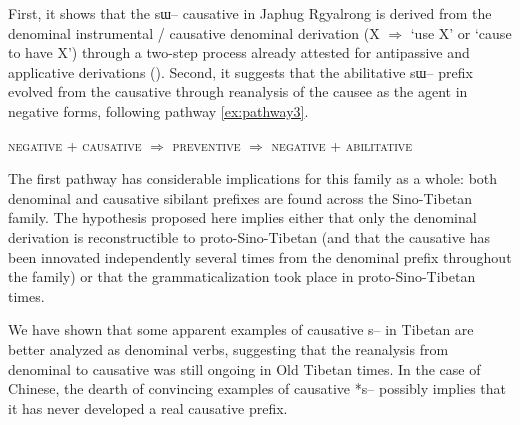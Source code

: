 \documentclass[oldfontcommands,oneside,a4paper,11pt]{article}
\newcommand{\ipa}[1]{{\phon \mbox{#1}}} %
\begin{document}
 First, it shows that the \ipa{sɯ--} causative in Japhug Rgyalrong is derived from the denominal instrumental  / causative denominal derivation (X $\Rightarrow$ `use X' or `cause to have X') through a two-step process already attested for antipassive and applicative derivations (\citealt{jacques14antipassive}). Second, it   suggests that the abilitative \ipa{sɯ--} prefix evolved from the causative through reanalysis of the causee as the agent in negative forms, following pathway \ref{ex:pathway3}.
 
{\small
\begin{exe}
\ex \label{ex:pathway3}
\glt \textsc{negative}   + \textsc{causative} $\Rightarrow$ \textsc{preventive} $\Rightarrow$ \textsc{negative} +  \textsc{abilitative} 
\end{exe}
}

The first pathway has considerable implications for this family as a whole: both denominal and causative sibilant prefixes are found across the Sino-Tibetan family. The hypothesis proposed here implies either that only the denominal derivation is reconstructible to proto-Sino-Tibetan (and that the causative has been innovated independently several times from the denominal prefix throughout the family) or that the grammaticalization took place in proto-Sino-Tibetan times.

We have shown that  some apparent examples of causative \ipa{s--} in Tibetan are better analyzed as denominal verbs, suggesting that the reanalysis from denominal to causative was still ongoing in Old Tibetan times. In the case of Chinese, the dearth of convincing examples of causative *\ipa{s--} possibly implies that it has never developed a real causative prefix.



\end{document}
